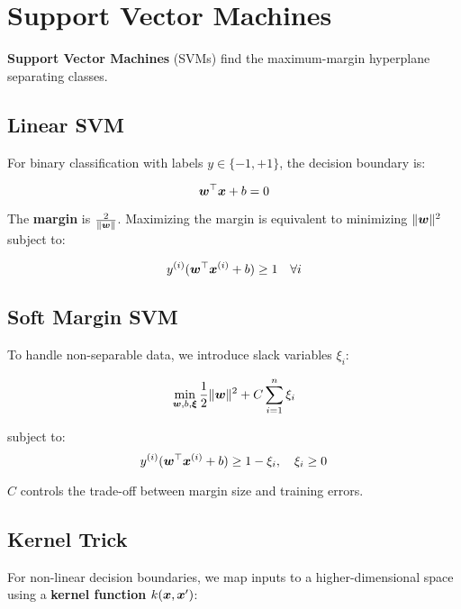 
\section{Support Vector Machines}
\label{sec:svm}

\textbf{Support Vector Machines} (SVMs) find the maximum-margin hyperplane separating classes.

\subsection{Linear SVM}

For binary classification with labels $y \in \{-1, +1\}$, the decision boundary is:

\begin{equation}
\boldsymbol{w}^\top \boldsymbol{x} + b = 0
\end{equation}

The \textbf{margin} is $\frac{2}{\|\boldsymbol{w}\|}$. Maximizing the margin is equivalent to minimizing $\|\boldsymbol{w}\|^2$ subject to:

\begin{equation}
y^{(i)}(\boldsymbol{w}^\top \boldsymbol{x}^{(i)} + b) \geq 1 \quad \forall i
\end{equation}

\subsection{Soft Margin SVM}

To handle non-separable data, we introduce slack variables $\xi_i$:

\begin{equation}
\min_{\boldsymbol{w}, b, \boldsymbol{\xi}} \frac{1}{2}\|\boldsymbol{w}\|^2 + C \sum_{i=1}^{n} \xi_i
\end{equation}

subject to:
\begin{equation}
y^{(i)}(\boldsymbol{w}^\top \boldsymbol{x}^{(i)} + b) \geq 1 - \xi_i, \quad \xi_i \geq 0
\end{equation}

$C$ controls the trade-off between margin size and training errors.

\subsection{Kernel Trick}

For non-linear decision boundaries, we map inputs to a higher-dimensional space using a \textbf{kernel function} $k(\boldsymbol{x}, \boldsymbol{x}')$:

